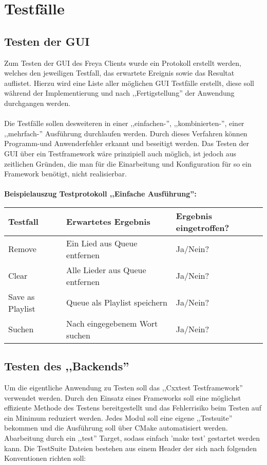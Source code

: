 \newpage
\section{Testfälle}

\subsection{Testen der GUI}
Zum Testen der GUI des Freya Clients wurde ein Protokoll erstellt werden, welches den
jeweiligen Testfall, das erwartete Ereignis sowie das Resultat auflistet. Hierzu wird
eine Liste aller möglichen GUI Testfälle erstellt, diese soll während der Implementierung 
und nach ,,Fertigstellung'' der Anwendung durchgangen werden.
\\
\\
Die Testfälle sollen desweiteren in einer ,,einfachen-'', ,,kombinierten-'', einer ,,mehrfach-''
Ausführung durchlaufen werden.
Durch dieses Verfahren können Programm-und Anwenderfehler erkannt und beseitigt werden.
Das Testen der GUI über ein Testframework wäre prinzipiell auch möglich, ist jedoch aus zeitlichen
Gründen, die man für die Einarbeitung und Konfiguration für so ein Framework benötigt, nicht realisierbar.
\\
\\
\textbf{Beispielauszug Testprotokoll ,,Einfache Ausführung'':}
\\
\begin{tabularx}{\textwidth}{|X|X|l|}
    \hline
    \textbf{Testfall} & \textbf{Erwartetes Ergebnis} & \textbf{Ergebnis eingetroffen?}\\
    \hline
    Remove & Ein Lied aus Queue entfernen & Ja/Nein?\\
    \hline
    Clear & Alle Lieder aus Queue entfernen & Ja/Nein?\\
    \hline
    Save as Playlist & Queue als Playlist speichern & Ja/Nein?\\
    \hline
    Suchen & Nach eingegebenem Wort suchen & Ja/Nein?\\
    \hline
\end{tabularx}


\subsection{Testen des ,,Backends''}

Um die eigentliche Anwendung zu Testen soll das ,,Cxxtest Testframework''
verwendet werden. Durch den Einsatz eines Frameworks soll eine möglichst effiziente Methode des Testens bereitgestellt
und das Fehlerrisiko beim Testen auf ein Minimum reduziert werden. Jedes Modul soll eine eigene ,,Testsuite'' bekommen und die
Ausführung soll über CMake automatisiert werden. Abarbeitung durch ein ,,test'' Target, sodass einfach 'make test' gestartet werden kann.
Die TestSuite Dateien bestehen aus einem Header der sich nach folgenden Konventionen richten soll: 

